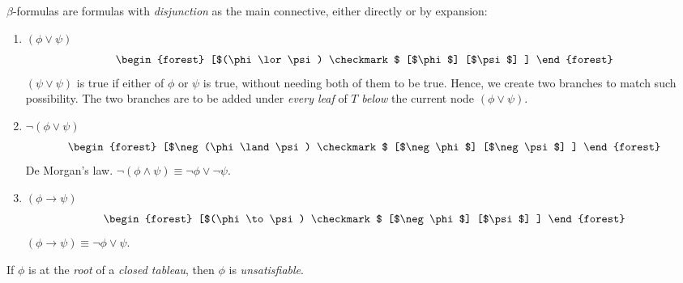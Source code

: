 \begin{definition}
    $\beta$-formulas are formulas with \textit{disjunction} as the main 
    connective, either directly or by expansion:
    
    \begin{enumerate}
        \item $(\phi \lor \psi)$
            \begin{equation}
                \begin{forest}
                    [$(\phi \lor \psi) \checkmark$
                        [$\phi$]
                        [$\psi$]
                    ]
                \end{forest}
            \end{equation}
            $(\psi \lor \psi)$ is true if either of $\phi$ or $\psi$ is true,
            without needing both of them to be true. Hence, we create two
            branches to match such possibility. The two branches are to be
            added under \textit{every leaf} of $T$ \textit{below} the current 
            node $(\phi \lor \psi)$.
        \item $\neg (\phi \lor \psi)$
            \begin{equation}
                \begin{forest}
                    [$\neg (\phi \land \psi) \checkmark$
                        [$\neg \phi$]
                        [$\neg \psi$]
                    ]
                \end{forest}
            \end{equation}
            De Morgan's law. $\neg (\phi \land \psi)
            \equiv \neg \phi \lor \neg \psi$.
        \item $(\phi \to \psi)$
            \begin{equation}
                \begin{forest}
                    [$(\phi \to \psi) \checkmark$
                        [$\neg \phi$]
                        [$\psi$]
                    ]
                \end{forest}
            \end{equation}
            $(\phi \to \psi) \equiv \neg \phi \lor \psi$.
    \end{enumerate}
\end{definition}

\begin{definition}
    If $\phi$ is at the \textit{root} of a \textit{closed tableau}, then
    $\phi$ is \textit{unsatisfiable}.
\end{definition}

